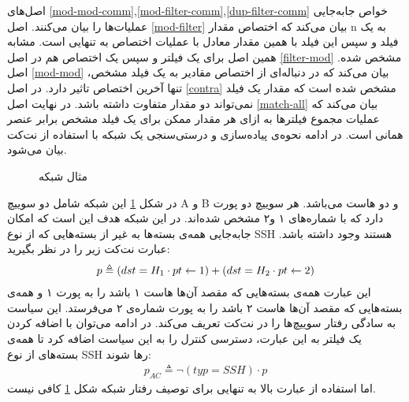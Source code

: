اصل‌های
\ref{mod-mod-comm},\ref{mod-filter-comm},\ref{dup-filter-comm}
خواص جابه‌جایی عملیات‌ها را بیان می‌کنند.
اصل
\ref{mod-filter}
بیان می‌کند که اختصاص مقدار
n
به یک فیلد و سپس این فیلد با همین مقدار معادل با عملیات اختصاص به تنهایی است.
مشابه همین اصل برای یک فیلتر و سپس یک اختصاص هم در اصل
\ref{filter-mod}
مشخص شده.
اصل
\ref{mod-mod}
بیان می‌کند که در دنباله‌ای از اختصاص مقادیر به یک فیلد مشخص، تنها آخرین اختصاص تاثیر دارد.
در اصل
\ref{contra}
مشخص شده است که مقدار یک فیلد نمی‌تواند دو مقدار متفاوت داشته باشد.
در نهایت اصل
\ref{match-all}
بیان می‌کند که عملیات مجموع فیلتر‌ها به ازای هر مقدار ممکن برای یک فیلد مشخص برابر عنصر همانی است.
در ادامه نحوه‌ی پیاده‌سازی و درستی‌سنجی یک شبکه با استفاده از نت‌کت بیان می‌شود.
\begin{figure}
    \centering
    \caption{مثال شبکه}
    \label{netkat:ssh}
\end{figure}
در شکل
\ref{netkat:ssh}
این شبکه شامل دو سوییچ
A و ‌B
و دو هاست می‌باشد.
هر سوییچ دو پورت دارد که با شماره‌های ۱ و۲ مشخص شده‌اند.
در این شبکه هدف این است که امکان جا‌به‌جایی همه‌ی بسته‌ها به غیر از بسته‌هایی که از نوع
SSH
هستند وجود داشته باشد.
عبارت نت‌کت زیر را در نظر بگیرید:
\begin{align*}
    p \triangleq (dst = H_1 \cdot pt \leftarrow 1) +
    (dst = H_2 \cdot pt \leftarrow 2)
\end{align*}
این عبارت همه‌ی بسته‌هایی که مقصد آن‌ها هاست ۱ باشد را به پورت ۱ و همه‌ی بسته‌هایی که مقصد‌ آن‌ها هاست ۲ باشد را به پورت شماره‌ی ۲ می‌فرستد.
این سیاست به سادگی رفتار سوییچ‌ها را در نت‌کت تعریف می‌کند.
در ادامه می‌توان با اضافه کردن یک فیلتر به این عبارت، دسترسی کنترل را به این سیاست اضافه کرد تا همه‌ی بسته‌های از نوع
SSH
رها شوند:
\begin{align*}
    p_{AC} \triangleq \neg(typ = SSH)\cdot p
\end{align*}
اما استفاده از عبارت بالا به تنهایی برای توصیف رفتار شبکه شکل
\ref{netkat:ssh}
کافی‌ نیست.
